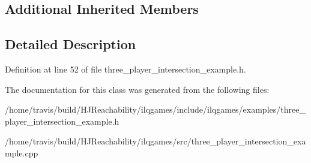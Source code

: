 \subsection*{Additional Inherited Members}


\subsection{Detailed Description}


Definition at line 52 of file three\+\_\+player\+\_\+intersection\+\_\+example.\+h.



The documentation for this class was generated from the following files\+:\begin{DoxyCompactItemize}
\item 
/home/travis/build/\+H\+J\+Reachability/ilqgames/include/ilqgames/examples/three\+\_\+player\+\_\+intersection\+\_\+example.\+h\item 
/home/travis/build/\+H\+J\+Reachability/ilqgames/src/three\+\_\+player\+\_\+intersection\+\_\+example.\+cpp\end{DoxyCompactItemize}
